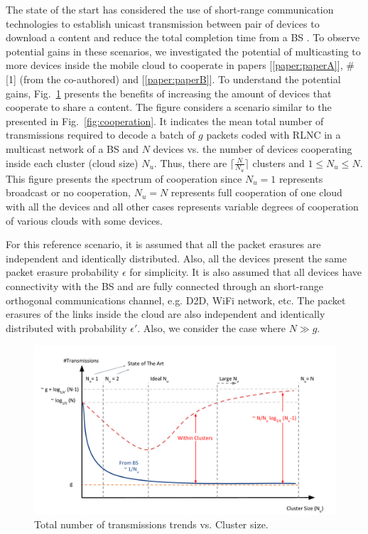 The state of the start has considered the use of short-range communication technologies to establish unicast transmission between pair of devices to download a content and reduce the total completion time from a \ac{BS} \cite{khamfroush2013minimizing,khamfroush2015optimal}. To observe potential gains in these scenarios, we investigated the potential of multicasting to more devices inside the mobile cloud to cooperate in papers {[\ref{paper:paperA}]}, \#[1] (from the co-authored) and {[\ref{paper:paperB}]}. To understand the potential gains, Fig.~\ref{fig:cloud_sizes} presents the benefits of increasing the amount of devices that cooperate to share a content. The figure considers a scenario similar to the presented in Fig.~\ref{fig:cooperation}. It indicates the mean total number of transmissions required to decode a batch of $g$ packets coded with \ac{RLNC} in a multicast network of a \ac{BS} and $N$ devices vs. the number of devices cooperating inside each cluster (cloud size) $N_u$. Thus, there are $\lceil \frac{N}{N_u} \rceil$ clusters and $1 \leq N_u \leq N$. This figure presents the spectrum of cooperation since $N_u = 1$ represents broadcast or no cooperation, $N_u = N$ represents full cooperation of one cloud with all the devices and all other cases represents variable degrees of cooperation of various clouds with some devices.

For this reference scenario, it is assumed that all the packet erasures are independent and identically distributed. Also, all the devices present the same packet erasure probability $\epsilon$ for simplicity. It is also assumed that all devices have connectivity with the \ac{BS} and are fully connected through an short-range orthogonal communications channel, e.g. \ac{D2D}, \ac{WiFi} network, etc. The packet erasures of the links inside the cloud are also independent and identically distributed with probability $\epsilon'$. Also, we consider the case where $N \gg g$.

\begin{figure}[h]
  \centering
  \includegraphics[width=\textwidth]{introduction/figures/cloud_sizes.pdf}
  \caption{Total number of transmissions trends vs. Cluster size.}
\label{fig:cloud_sizes}
\end{figure}

